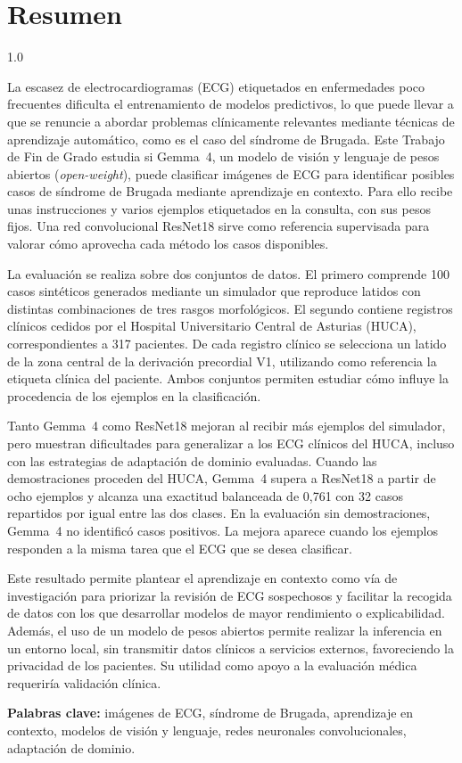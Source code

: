 \chapter*{Resumen}
\begin{spacing}{1.0}

La escasez de electrocardiogramas (ECG) etiquetados en enfermedades poco frecuentes dificulta el entrenamiento de modelos predictivos, lo que puede llevar a que se renuncie a abordar problemas clínicamente relevantes mediante técnicas de aprendizaje automático, como es el caso del síndrome de Brugada. Este Trabajo de Fin de Grado estudia si Gemma~4, un modelo de visión y lenguaje de pesos abiertos (\textit{open-weight}), puede clasificar imágenes de ECG para identificar posibles casos de síndrome de Brugada mediante aprendizaje en contexto. Para ello recibe unas instrucciones y varios ejemplos etiquetados en la consulta, con sus pesos fijos. Una red convolucional ResNet18 sirve como referencia supervisada para valorar cómo aprovecha cada método los casos disponibles.

La evaluación se realiza sobre dos conjuntos de datos. El primero comprende 100 casos sintéticos generados mediante un simulador que reproduce latidos con distintas combinaciones de tres rasgos morfológicos. El segundo contiene registros clínicos cedidos por el Hospital Universitario Central de Asturias (HUCA), correspondientes a 317 pacientes. De cada registro clínico se selecciona un latido de la zona central de la derivación precordial V1, utilizando como referencia la etiqueta clínica del paciente. Ambos conjuntos permiten estudiar cómo influye la procedencia de los ejemplos en la clasificación.

Tanto Gemma~4 como ResNet18 mejoran al recibir más ejemplos del simulador, pero muestran dificultades para generalizar a los ECG clínicos del HUCA, incluso con las estrategias de adaptación de dominio evaluadas. Cuando las demostraciones proceden del HUCA, Gemma~4 supera a ResNet18 a partir de ocho ejemplos y alcanza una exactitud balanceada de 0,761 con 32 casos repartidos por igual entre las dos clases. En la evaluación sin demostraciones, Gemma~4 no identificó casos positivos. La mejora aparece cuando los ejemplos responden a la misma tarea que el ECG que se desea clasificar.

Este resultado permite plantear el aprendizaje en contexto como vía de investigación para priorizar la revisión de ECG sospechosos y facilitar la recogida de datos con los que desarrollar modelos de mayor rendimiento o explicabilidad. Además, el uso de un modelo de pesos abiertos permite realizar la inferencia en un entorno local, sin transmitir datos clínicos a servicios externos, favoreciendo la privacidad de los pacientes. Su utilidad como apoyo a la evaluación médica requeriría validación clínica.

\textbf{Palabras clave:} imágenes de ECG, síndrome de Brugada, aprendizaje en contexto, modelos de visión y lenguaje, redes neuronales convolucionales, adaptación de dominio.

\end{spacing}
